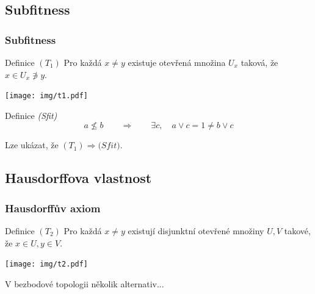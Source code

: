 \documentclass[mathserif]{beamer}
\begin{document}

\subsection{Subfitness}

\begin{frame}
\frametitle{Subfitness}

\begin{block}{Definice $(T_1)$}
  Pro každá $x \ne y$ existuje otevřená množina $U_x$ taková, že $x \in U_x
  \not\owns y$.
\end{block}

\begin{center}
  \texttt{[image: img/t1.pdf]}
\end{center}
\pause

\begin{block}{Definice \textit{(Sfit)}}
  \[
    a \not\le b \qquad \Rightarrow \qquad \exists c, \quad a \vee c = 1 \ne b
    \vee c
  \]
\end{block}
\pause

Lze ukázat, že \alert{$(T_1) \Rightarrow \textit{(Sfit)}$}.
\end{frame}


\subsection{Hausdorffova vlastnost}

\begin{frame}
\frametitle{Hausdorffův axiom}

\begin{block}{Definice $(T_2)$}
  Pro každá $x \ne y$ existují \alert{disjunktní} otevřené množiny $U, V$
  takové, že $x \in U, y \in V$.
\end{block}

\begin{center}
  \texttt{[image: img/t2.pdf]}
\end{center}
\pause

V bezbodové topologii několik alternativ...
\end{frame}

\end{document}
